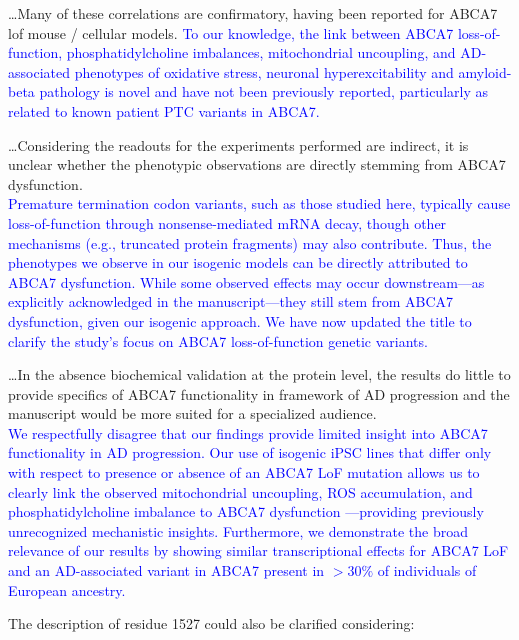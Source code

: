 \dots Many of these correlations are confirmatory, having been reported for ABCA7 lof mouse / cellular models. 
\textcolor{blue}{To our knowledge, the link between ABCA7 loss-of-function, phosphatidylcholine imbalances, mitochondrial uncoupling, and AD-associated phenotypes of oxidative stress, neuronal hyperexcitability and amyloid-beta pathology is novel and have not been previously reported, particularly as related to known patient PTC variants in ABCA7.}

\dots Considering the readouts for the experiments performed are indirect, it is unclear whether the phenotypic observations are directly stemming from ABCA7 dysfunction.\\ 
\textcolor{blue}{Premature termination codon variants, such as those studied here, typically cause loss-of-function through nonsense-mediated mRNA decay, though other mechanisms (e.g., truncated protein fragments) may also contribute. Thus, the phenotypes we observe in our isogenic models can be directly attributed to ABCA7 dysfunction. While some observed effects may occur downstream—as explicitly acknowledged in the manuscript—they still stem from ABCA7 dysfunction, given our isogenic approach. We have now updated the title to clarify the study's focus on ABCA7 loss-of-function genetic variants.}

\dots In the absence biochemical validation at the protein level, the results do little to provide specifics of ABCA7 functionality in framework of AD progression and the manuscript would be more suited for a specialized audience.\\ 
\textcolor{blue}{We respectfully disagree that our findings provide limited insight into ABCA7 functionality in AD progression. Our use of isogenic iPSC lines that differ only with respect to presence or absence of an ABCA7 LoF mutation allows us to clearly link the observed mitochondrial uncoupling, ROS accumulation, and phosphatidylcholine imbalance to ABCA7 dysfunction —providing previously unrecognized mechanistic insights. Furthermore, we demonstrate the broad relevance of our results by showing similar transcriptional effects for ABCA7 LoF and an  AD-associated variant in ABCA7 present in $>30\%$ of individuals of European ancestry.}

The description of residue 1527 could also be clarified considering:

